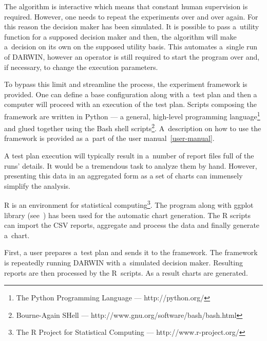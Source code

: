 The algorithm is interactive which means that constant human supervision is
required. However, one needs to repeat the experiments over and over
again. For this reason the decision maker has been simulated. It is possible
to pass a~utility function for a supposed decision maker and then, the
algorithm will make a~decision on its own on the supposed utility basis. This
automates a~single run of DARWIN, however an operator is still required to
start the program over and, if necessary, to change the execution parameters.

To bypass this limit and streamline the process, the experiment framework is
provided. One can define a base configuration along with a~test plan and then
a computer will proceed with an execution of the test plan. Scripts composing
the framework are written in Python --- a general, high-level programming
language\footnote{The Python Programming Language --- http://python.org/} and
glued together using the Bash shell scripts\footnote{Bourne-Again SHell ---
  http://www.gnu.org/software/bash/bash.html}. A~description on how to use the
framework is provided as a~part of the user manual~\ref{user-manual}.

A test plan execution will typically result in a~number of report files full
of the runs' details. It would be a tremendous task to analyze them by
hand. However, presenting this data in an aggregated form as a set of charts
can immensely simplify the analysis.

R is an environment for statistical computing\footnote{The R Project for
  Statistical Computing --- http://www.r-project.org/}. The program along with
ggplot library (see~\cite{Wic09}) has been used for the automatic chart
generation. The R scripts can import the CSV reports, aggregate and process
the data and finally generate a~chart.

First, a user prepares a~test plan and sends it to the framework. The
framework is repeatedly running DARWIN with a~simulated decision
maker. Resulting reports are then processed by the R~scripts. As a result
charts are generated.

